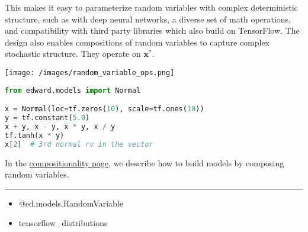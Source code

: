 This makes it easy to parameterize random variables with complex
deterministic structure, such as with deep neural networks, a diverse
set of math operations, and compatibility with third party libraries
which also build on TensorFlow.
The design also enables compositions of random variables
to capture complex stochastic structure.
They operate on $\mathbf{x}^*$.

\texttt{[image: /images/random\_variable\_ops.png]}

\begin{lstlisting}[language=Python]
from edward.models import Normal

x = Normal(loc=tf.zeros(10), scale=tf.ones(10))
y = tf.constant(5.0)
x + y, x - y, x * y, x / y
tf.tanh(x * y)
x[2]  # 3rd normal rv in the vector
\end{lstlisting}

In the \href{/api/model-compositionality}{compositionality page}, we
describe how to build models by composing random variables.

\begin{center}\rule{3in}{0.4pt}\end{center}

\begin{itemize}
  \item @{ed.models.RandomVariable}
  \item {{tensorflow_distributions}}
\end{itemize}

